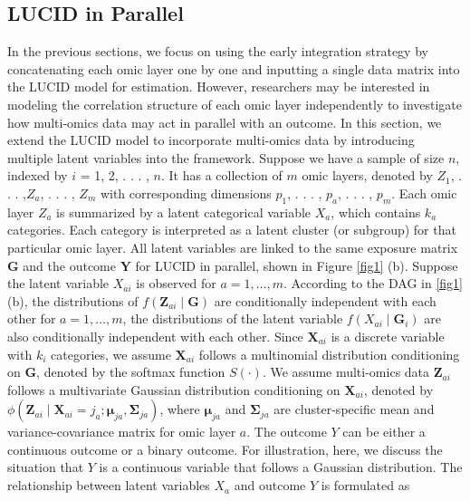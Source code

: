 \subsection{LUCID in Parallel} \label{sec_parallel}
In the previous sections, we focus on using the early integration strategy by concatenating each omic layer one by one and inputting a single data matrix into the LUCID model for estimation. However, researchers may be interested in modeling the correlation structure of each omic layer independently to investigate how multi-omics data may act in parallel with an outcome. In this section, we extend the LUCID model to incorporate multi-omics data by introducing multiple latent variables into the framework. Suppose we have a sample of size $n$, indexed by $i$ = 1, 2, . . . , $n$. It has a collection of $m$ omic layers, denoted by $Z_1$, . . . ,$Z_a$, . . . , $Z_m$ with corresponding dimensions $p_1$, . . . , $p_a$, . . . , $p_m$. Each omic layer $Z_a$ is summarized by a latent categorical variable $X_a$, which contains $k_a$ categories. Each category is interpreted as a latent cluster (or subgroup) for that particular omic layer. All latent variables are linked to the same exposure matrix $\bm G$ and the outcome $\bm Y$ for LUCID in parallel, shown in Figure \ref{fig1} (b). 
Suppose the latent variable $X_{a i}$ is observed for $a=1, \ldots, m$. According to the DAG in \ref{fig1} (b), the distributions of $f\left(\boldsymbol{Z}_{a i} \mid \boldsymbol{G}\right)$ are conditionally independent with each other for $a=1, \ldots, m$, the distributions of the latent variable $f\left(X_{a i} \mid \boldsymbol{G}_{i}\right)$ are also conditionally independent with each other. 
Since $\boldsymbol{X}_{a i}$ is a discrete variable with $k_{i}$ categories, we assume $\boldsymbol{X}_{a i}$ follows a multinomial distribution conditioning on $\boldsymbol{G}$, denoted by the softmax function $S(\cdot)$. We assume multi-omics data $\boldsymbol{Z}_{a i}$ follows a multivariate Gaussian distribution conditioning on $\boldsymbol{X}_{a i}$, denoted by $\phi\left(\boldsymbol{Z}_{a i} \mid \boldsymbol{X}_{a i}=j_{a} ; \boldsymbol{\mu}_{j a}, \boldsymbol{\Sigma}_{j a}\right)$, where $\boldsymbol{\mu}_{j a}$ and $\boldsymbol{\Sigma}_{j a}$ are cluster-specific mean and variance-covariance matrix for omic layer $a$. The outcome $Y$ can be either a continuous outcome or a binary outcome. For illustration, here, we discuss the situation that $Y$ is a continuous variable that follows a Gaussian distribution. The relationship between latent variables $X_{a}$ and outcome $Y$ is formulated as
